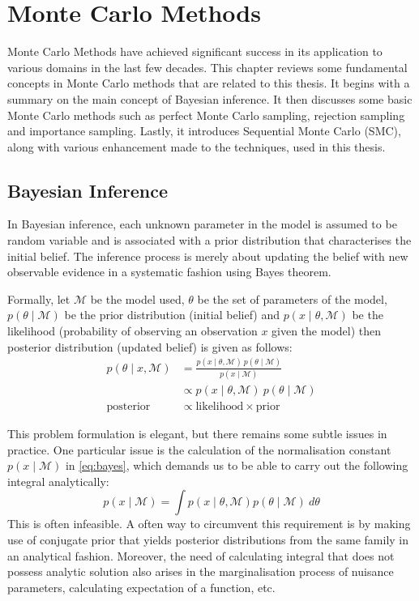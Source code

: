 \chapter{Monte Carlo Methods}
\graphicspath{{Chapter2/figures/}}
\label{cha:mcmethods}
Monte Carlo Methods have achieved significant success in its application to various domains in the last few decades. This chapter reviews some fundamental concepts in Monte Carlo methods that are related to this thesis. It begins with a summary on the main concept of Bayesian inference. It then discusses some basic Monte Carlo methods such as perfect Monte Carlo sampling, rejection sampling and importance sampling. Lastly, it introduces Sequential Monte Carlo (SMC), along with various enhancement made to the techniques, used in this thesis.

\section{Bayesian Inference}
In Bayesian inference, each unknown parameter in the model is assumed to be random variable and is associated with a prior distribution that characterises the initial belief. The inference process is merely about updating the belief with new observable evidence in a systematic fashion using Bayes theorem.

Formally, let $\mathcal{M}$ be the model used, $\theta$ be the set of parameters of the model, $p\left(\theta \mid \mathcal{M}\right)$ be the prior distribution (initial belief) and $p(x \mid \theta, \mathcal{M})$ be the likelihood (probability of observing an observation $x$ given the model) then posterior distribution (updated belief) is given as follows:  
\begin{align}
  p(\theta \mid x , \mathcal{M}) &= \frac{p(x \mid \theta , \mathcal{M})~p(\theta \mid \mathcal{M})}{p(x \mid \mathcal{M})} \nonumber \\
                   &\propto p(x \mid \theta , \mathcal{M})~p(\theta \mid \mathcal{M}) \label{eq:bayes} \\
  \text{posterior} &\propto \text{likelihood} \times \text{prior}
\end{align}

This problem formulation is elegant, but there remains some subtle issues in practice. One particular issue is the calculation of the normalisation constant $p(x \mid \mathcal{M})$ in \eqref{eq:bayes}, which demands us to be able to carry out the following integral  analytically:
\begin{equation}
  p(x \mid \mathcal{M}) = \int p(x \mid \theta, \mathcal{M}) p(\theta \mid \mathcal{M})~d\theta
\end{equation}
This is often infeasible. A often way to circumvent this requirement is by making use of conjugate prior that yields posterior distributions from the same family in an analytical fashion. Moreover, the need of calculating integral that does not possess analytic solution also arises in the marginalisation process of nuisance parameters, calculating expectation of a function, etc.

